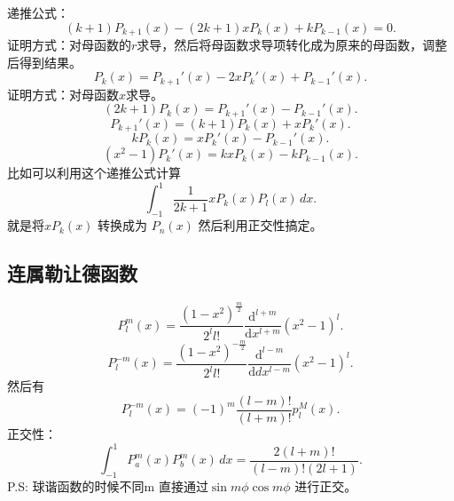 \documentclass[12pt,a4paper,openany,twoside]{book}
\numberwithin{equation}{section}
\begin{document}
          递推公式：
          \begin{equation}
            (k+1) P_{k+1} (x) - (2k+1) x P_k(x) + kP_{k-1} (x) = 0
          .
          \end{equation}
          证明方式：对母函数的$r$求导，然后将母函数求导项转化成为原来的母函数，调整后得到结果。
          \begin{equation}
            P_k (x) = P_{k+1}' (x) - 2 x P_k'(x) + P_{k-1}' (x)
          .
          \end{equation} 
          证明方式：对母函数$x$求导。
          \begin{equation}
            (2k+1) P_k (x)   = P_{k+1}'(x) - P_{k-1}'(x)
          .
          \end{equation} 
          \begin{equation}
            P_{k+1}'(x) = (k+1) P_k(x) + xP_k' (x)
          .
          \end{equation} 
          \begin{equation}
            kP_k(x) = xP_k'(x) - P_{k-1}'(x)
          .
          \end{equation} 
          \begin{equation}
            (x^2 -1) P_k'(x) = kx P_k(x) - kP_{k-1} (x)
          .
          \end{equation} 
          比如可以利用这个递推公式计算
          \begin{equation}
            \int _{-1}^1 \frac{1}{2k+1 } x P_k (x) P_l(x) \, dx 
          .
          \end{equation} 
          就是将$x P_k (x)$ 转换成为 $P_n(x)$ 然后利用正交性搞定。

          \subsection{连属勒让德函数}
          \begin{equation}
            P_l^m (x) = \frac{(1-x^2)^{\frac{m}{2}}}{2^l l!} \frac{\mathrm{d} ^{l+m}}{\mathrm{d} x^{l+m}}  (x^2-1)^l
          .
          \end{equation} 
          \begin{equation}
            P_l^{-m} (x) = \frac{(1-x^2) ^{-\frac{m}{2}}}{2^l l! } \frac{\mathrm{d} ^{l-m}}{\mathrm{d} dx^{l-m}} (x^2-1)^l
          .
          \end{equation} 
          然后有
          \begin{equation}
            P_l^{-m} (x) = (-1)^m \frac{(l-m)!}{(l+m)!} p_l^M(x)
          .
          \end{equation} 
          正交性：
          \begin{equation}
            \int _{-1}^1 P_a^m(x) P_b^m(x)  \, dx  =  \frac{2(l+m)!}{(l-m)! (2l+1)}
          .
          \end{equation} 
          P.S: 球谐函数的时候不同m 直接通过$ \sin{m\phi} \cos{m\phi} $ 进行正交。
           
\end{document}
